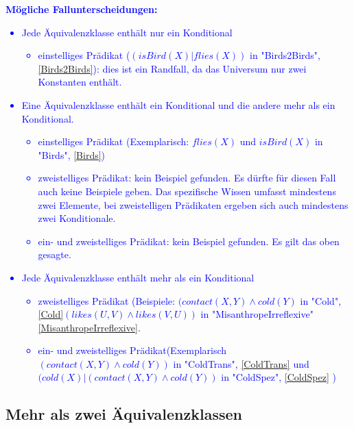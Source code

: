 \documentclass[a4paper, 11pt]{book}
\begin{document}
\textcolor{blue}{
\textbf{Mögliche Fallunterscheidungen:} \label{Fallunterscheidung Formel 2Aequi}
\begin{itemize}
	\item Jede Äquivalenzklasse enthält nur ein Konditional 
	\begin{itemize}
		\item einstelliges Prädikat ($ (isBird(X)|flies(X)) $ in "{}Birds2Birds"{}, \ref{Birds2Birds}): dies ist ein Randfall, da das Universum nur zwei Konstanten enthält.
	\end{itemize}
	\item Eine Äquivalenzklasse enthält ein Konditional und die andere mehr als ein Konditional. 
	\begin{itemize}
		\item einstelliges Prädikat (Exemplarisch: $ flies(X) $ und $ isBird(X) $ in "{}Birds"{}, \ref{Birds}) 
		\item zweistelliges Prädikat: kein Beispiel gefunden. Es dürfte für diesen Fall auch keine Beispiele geben. Das spezifische Wissen umfasst mindestens zwei Elemente, bei zweistelligen Prädikaten ergeben sich auch mindestens zwei Konditionale.
		\item  ein- und zweistelliges Prädikat: kein Beispiel gefunden. Es gilt das oben gesagte.   
	\end{itemize}
	\item Jede Äquivalenzklasse enthält mehr als ein Konditional 
	\begin{itemize}
		\item zweistelliges Prädikat (Beispiele: $ (contact(X,Y) \land cold(Y) $ in "{}Cold"{}, \ref{Cold}$ (likes(U,V) \land likes(V,U)) $ in "{}MisanthropeIrreflexive"{} \ref{MisanthropeIrreflexive}.  
		\item ein- und zweistelliges Prädikat(Exemplarisch $ (contact(X,Y) \land cold(Y)) $ in "{}ColdTrans"{}, \ref{ColdTrans} und  $  (cold(X) | (contact(X,Y) \land cold(Y)) $ in "{}ColdSpez"{}, \ref{ColdSpez} ) 
	\end{itemize}
\end{itemize}
}

\subsection{Mehr als zwei Äquivalenzklassen} 
\end{document}
